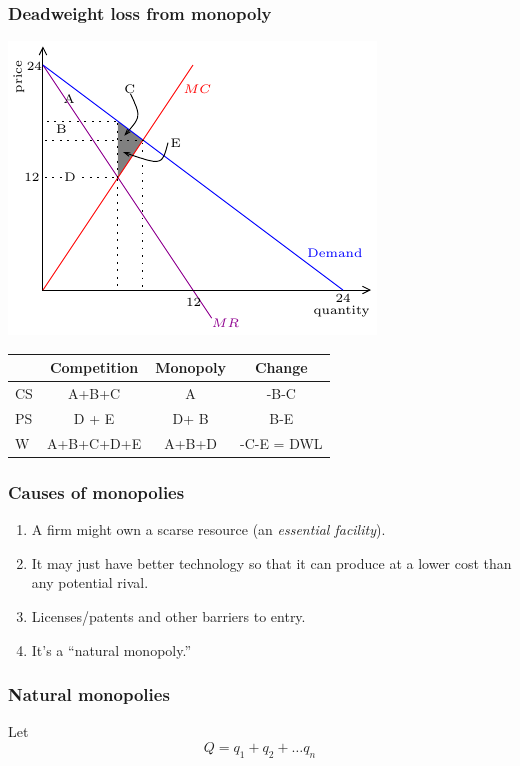 \documentclass[xcolor=pdftex,dvipsnames]{beamer}
\begin{document}
\begin{frame}
  \frametitle{Deadweight loss from monopoly}
  \begin{center}
    \includegraphics{pics/DWL}

  {\scriptsize
    \begin{tabular}{lccc}
\hline      & Competition & Monopoly & Change\\
\hline      CS & A+B+C &A &{-B-C}\\
\hline      PS & D + E & D+ B &  B-E \\
\hline      W & A+B+C+D+E &  A+B+D &  -C-E = DWL\\\hline
    \end{tabular}
  }
  \end{center}\end{frame}



\begin{frame}
  \frametitle{Causes of monopolies}
  \begin{enumerate}
  \item A firm might own a scarse resource (an \emph{essential facility}).

  \item<2-> It may just have better technology so that it can produce
    at a lower cost than any potential rival.
\item <3-> Licenses/patents  and other barriers to entry.
  \item<4-> It's a ``natural monopoly.''
  \end{enumerate}
\end{frame}

\begin{frame}
  \frametitle{Natural monopolies}
  Let 
\[
Q = q_1 + q_2 + \dots q_n
\]

\bigskip
{}

\end{frame}
\end{document}
